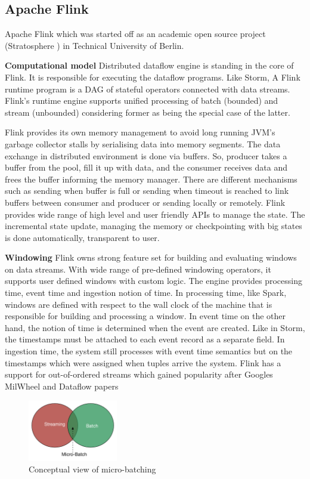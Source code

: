 \documentclass{vldb}
\begin{document}
\subsection{Apache Flink}
Apache Flink which was started off as an academic open source project (Stratosphere \cite{alexandrov2014stratosphere}) in Technical University of  Berlin.

\textbf{Computational model}
Distributed dataflow engine is standing in the core of Flink. It is responsible for executing the dataflow programs. Like Storm, A Flink runtime program is a DAG of stateful operators connected with data streams. Flink's runtime engine supports unified processing of batch (bounded) and stream (unbounded) considering former as being the special case of the latter.

Flink provides its own memory management to avoid long running JVM's garbage collector stalls by serialising data into memory segments. 
The data exchange in distributed environment is done via buffers. So, producer takes a buffer from the pool, fill it up with data, and the consumer receives data and frees the buffer informing the memory manager. There are different mechanisms such as sending when buffer is full or sending when timeout is reached to link buffers between consumer and producer or sending locally or remotely. Flink provides wide range of high level and user friendly APIs to manage the state. The incremental state update, managing the memory or checkpointing with big states is done automatically, transparent to user. 

\textbf{Windowing}
Flink owns strong feature set for building and evaluating windows on data streams. With wide range of pre-defined windowing operators, it supports user defined windows with custom logic. The engine provides processing time, event time and ingestion notion of time.  In processing time, like Spark,  windows are defined with respect to the wall clock of the machine that is responsible for building and processing  a window. In event time on the other hand, the notion of time is  determined when the event are created. Like in Storm, the timestamps must be attached to each event record as a separate field. In ingestion time, the system still processes with event time semantics but on the timestamps which were assigned when tuples arrive the system. Flink has a support for out-of-ordered streams which gained popularity after Googles MilWheel and Dataflow papers \cite{akidau2013millwheel,akidau2015dataflow}


\begin{figure}[h]
\centering
\includegraphics[width=0.35\textwidth]{streambatch}
\caption{Conceptual view of micro-batching}
\label{fig_micro_batch}
\end{figure}
\end{document}
